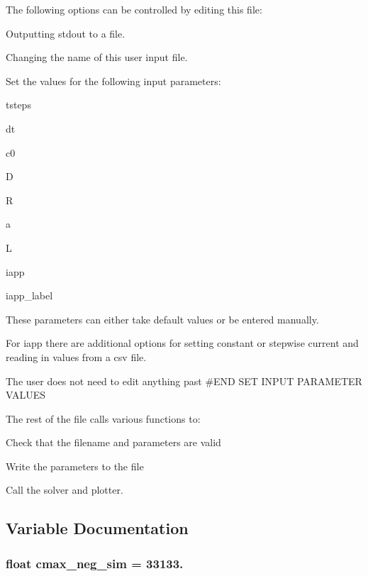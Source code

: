 The following options can be controlled by editing this file\-:
\begin{DoxyItemize}
\item Outputting stdout to a file.
\item Changing the name of this user input file.
\item Set the values for the following input parameters\-:
\begin{DoxyItemize}
\item tsteps
\item dt
\item c0
\item D
\item R
\item a
\item L
\item iapp
\item iapp\-\_\-label
\end{DoxyItemize}
\item These parameters can either take default values or be entered manually.
\item For iapp there are additional options for setting constant or stepwise current and reading in values from a csv file.
\end{DoxyItemize}

The user does not need to edit anything past \#\-E\-N\-D S\-E\-T I\-N\-P\-U\-T P\-A\-R\-A\-M\-E\-T\-E\-R V\-A\-L\-U\-E\-S

The rest of the file calls various functions to\-:
\begin{DoxyItemize}
\item Check that the filename and parameters are valid
\item Write the parameters to the file
\item Call the solver and plotter. 
\end{DoxyItemize}

\subsection{Variable Documentation}
\hypertarget{namespaceuser__input_ab7633a5e9c70aabfe6992e4fe521a1f9}{
\subsubsection[{cmax\-\_\-neg\-\_\-sim}]{\setlength{\rightskip}{0pt plus 5cm}float cmax\-\_\-neg\-\_\-sim = 33133.}}\label{namespaceuser__input_ab7633a5e9c70aabfe6992e4fe521a1f9}


